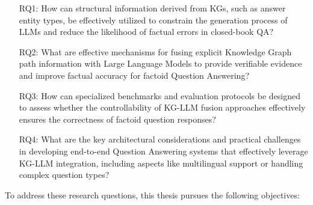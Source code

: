 \begin{enumerate}
    \item[RQ1:] How can structural information derived from KGs, such as answer entity types, be effectively utilized to constrain the generation process of LLMs and reduce the likelihood of factual errors in closed-book QA?
    
    \item[RQ2:] What are effective mechanisms for fusing explicit Knowledge Graph path information with Large Language Models to provide verifiable evidence and improve factual accuracy for factoid Question Answering?
    
    \item[RQ3:] How can specialized benchmarks and evaluation protocols be designed to assess whether the controllability of KG-LLM fusion approaches effectively ensures the correctness of factoid question responses?

    \item[RQ4:] What are the key architectural considerations and practical challenges in developing end-to-end Question Answering systems that effectively leverage KG-LLM integration, including aspects like multilingual support or handling complex question types?
\end{enumerate}

To address these research questions, this thesis pursues the following objectives:

